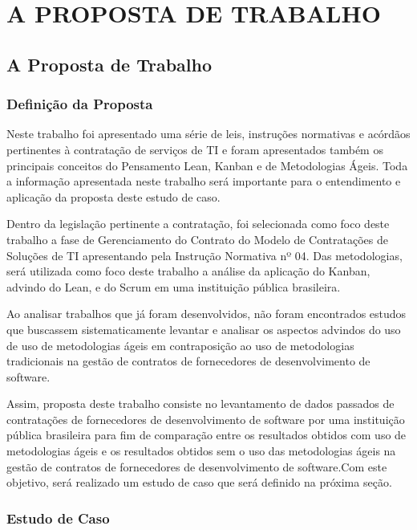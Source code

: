 \part{A PROPOSTA DE TRABALHO}

\chapter[A Proposta de Trabalho]{A Proposta de Trabalho}

\section[Definição da Proposta]{Definição da Proposta}

Neste trabalho foi apresentado uma série de leis, instruções normativas e acórdãos pertinentes à contratação de serviços de TI e foram apresentados também os principais conceitos do Pensamento Lean, Kanban e de Metodologias Ágeis. Toda a informação apresentada neste trabalho será importante para o entendimento e aplicação da proposta deste estudo de caso.

Dentro da legislação pertinente a contratação, foi selecionada como foco deste trabalho a fase de Gerenciamento do Contrato do Modelo de Contratações de Soluções de TI apresentando pela Instrução Normativa nº 04. Das metodologias, será utilizada como foco deste trabalho a análise da aplicação do Kanban, advindo do Lean,  e do Scrum em uma instituição pública brasileira. 

Ao analisar trabalhos que já foram desenvolvidos, não foram encontrados estudos que buscassem sistematicamente levantar e analisar os aspectos advindos do uso de uso de metodologias ágeis em contraposição ao uso de metodologias tradicionais na gestão de contratos de fornecedores de desenvolvimento de software.

Assim, proposta deste trabalho consiste no levantamento de dados passados de contratações de fornecedores de desenvolvimento de software por uma instituição pública brasileira para fim de comparação entre os resultados obtidos com uso de metodologias ágeis e os resultados obtidos sem o uso das metodologias ágeis na gestão de contratos de fornecedores de desenvolvimento de software.Com este objetivo, será realizado um estudo de caso que será definido na próxima seção.


\section[Estudo de Caso]{Estudo de Caso}


